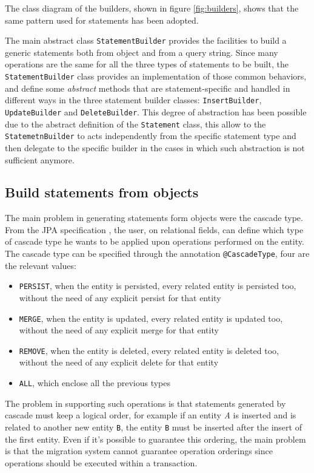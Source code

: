 \noindent The class diagram of the builders, shown in figure \ref{fig:builders}, shows that the same pattern used for statements has been adopted.

\noindent The main abstract class \texttt{StatementBuilder} provides the facilities to build a generic statements both from object and from a query string.
Since many operations are the same for all the three types of statements to be built, the \texttt{StatementBuilder} class provides an implementation of those common behaviors, and define some \textit{abstract} methods that are statement-specific and handled in different ways in the three statement builder classes: \texttt{InsertBuilder}, \texttt{UpdateBuilder} and \texttt{DeleteBuilder}.
This degree of abstraction has been possible due to the abstract definition of the \texttt{Statement} class, this allow to the \texttt{StatemetnBuilder} to acts independently from the specific statement type and then delegate to the specific builder in the cases in which such abstraction is not sufficient anymore.

\subsection{Build statements from objects}
The main problem in generating statements form objects were the cascade type. From the JPA specification \cite{book:projpa2}, the user, on relational fields, can define which type of cascade type he wants to be applied upon operations performed on the entity. The cascade type can be specified through the annotation \texttt{@CascadeType}, four are the relevant values:
\begin{itemize}
\item \texttt{PERSIST}, when the entity is persisted, every related entity is persisted too, without the need of any explicit persist for that entity
\item \texttt{MERGE}, when the entity is updated, every related entity is updated too, without the need of any explicit merge for that entity
\item \texttt{REMOVE}, when the entity is deleted, every related entity is deleted too, without the need of any explicit delete for that entity
\item \texttt{ALL}, which enclose all the previous types
\end{itemize}

\noindent The problem in supporting such operations is that statements generated by cascade must keep a logical order, for example if an entity \textit{A} is inserted and is related to another new entity \texttt{B}, the entity \texttt{B} must be inserted after the insert of the first entity. Even if it's possible to guarantee this ordering, the main problem is that the migration system cannot guarantee operation orderings since operations should be executed within a transaction.


